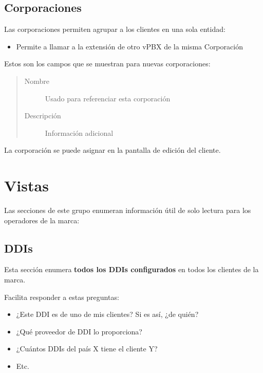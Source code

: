 \documentclass[letterpaper,10pt,spanish]{sphinxmanual}
\begin{document}
\subsection{Corporaciones}
\label{administration_portal/brand/settings/corporations:corporations}\label{administration_portal/brand/settings/corporations::doc}\label{administration_portal/brand/settings/corporations:id1}
Las corporaciones permiten agrupar a los clientes en una sola entidad:
\begin{itemize}
\item {} 
Permite a {\hyperref[administration_portal/client/vpbx/routing_endpoints/friends/internal_friends:internal\string-friends]{}} llamar a la extensión de otro vPBX de la misma Corporación

\end{itemize}

Estos son los campos que se muestran para nuevas corporaciones:
\begin{quote}
\begin{description}
\item[{Nombre}] \leavevmode
Usado para referenciar esta corporación

\item[{Descripción}] \leavevmode
Información adicional

\end{description}
\end{quote}

La corporación se puede asignar en la pantalla de edición del cliente.


\section{Vistas}
\label{administration_portal/brand/views/index::doc}\label{administration_portal/brand/views/index:views}
Las secciones de este grupo enumeran información útil de solo lectura para los operadores de la marca:


\subsection{DDIs}
\label{administration_portal/brand/views/ddis:ddis}\label{administration_portal/brand/views/ddis::doc}\label{administration_portal/brand/views/ddis:id1}
Esta sección enumera \textbf{todos los DDIs configurados} en todos los clientes de la marca.

Facilita responder a estas preguntas:
\begin{itemize}
\item {} 
¿Este DDI es de uno de mis clientes? Si es así, ¿de quién?

\item {} 
¿Qué proveedor de DDI lo proporciona?

\item {} 
¿Cuántos DDIs del país X tiene el cliente Y?

\item {} 
Etc.

\end{itemize}
\end{document}
